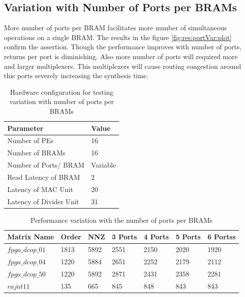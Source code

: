 \subsection{Variation with Number of Ports per BRAMs}

More number of ports per BRAM facilitates more number of simultaneous operations
on a single BRAM. The results in the figure \ref{fig:res:portVar:plot} confirm
the assertion. Though the performance improves with number of ports, returns per
port is diminishing. Also more number of ports will required more and larger multiplexers.
This multiplexers will cause routing congestion around this ports severely increasing
the synthesis time.

\begin{table}[H]
    \centering
    \caption{Hardware configuration for testing variation with number of ports per BRAMs}
    \label{tab:res:portVar:hwConfig}
    \begin{tabular}{L{6cm} L{1.5cm}}
        \toprule
        Parameter & Value \\
        \midrule
        Number of PEs           & 16  \\
        Number of BRAMs         & 16         \\
        Number of Ports/ BRAM   & Variable         \\
        Read Latency of BRAM    & 2          \\
        Latency of MAC Unit     & 20          \\
        Latency of Divider Unit & 31          \\
        \bottomrule
    \end{tabular}
\end{table}

\begin{table}[H]
    \centering
    \caption{Performance variation with the number of ports per BRAMs}
    \label{tab:res:portVar:data}
    \begin{tabular}{l l l l l l l} 
        \toprule
        Matrix Name & Order  & NNZ & 3 Ports & 4 Ports & 5 Ports & 6 Portss \\
        \midrule
        $fpga\_dcop\_01$ & 1813 & 5892 &         2551   &     2150     &   2020    &    1920   \\
        $fpga\_dcop\_04$ & 1220 & 5884 &         2651   &     2252     &   2179    &    2112   \\
        $fpga\_dcop\_50$ & 1220 & 5892 &         2871   &     2431     &   2358    &    2281   \\
        $rajat11$      & 135  &  665   &          845   &      848     &    843    &     843    \\
        \bottomrule
    \end{tabular}
\end{table}

